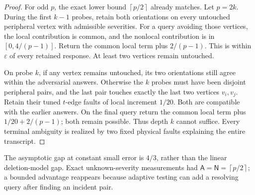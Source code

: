 \documentclass[11pt,letterpaper]{article}
\newcommand{\ceil}[1]{\left\lceil #1\right\rceil}
\newcommand{\A}{\mathsf A}
\newcommand{\N}{\mathsf N}
\begin{document}
\begin{proof}
For odd $p$, the exact lower bound $\ceil{p/2}$ already matches. Let $p=2k$. During the first $k-1$ probes, retain both orientations on every untouched peripheral vertex with admissible severities. For a query avoiding those vertices, the local contribution is common, and the nonlocal contribution is in $[0,4/(p-1)]$. Return the common local term plus $2/(p-1)$. This is within $\varepsilon$ of every retained response. At least two vertices remain untouched.

On probe $k$, if any vertex remains untouched, its two orientations still agree within the adversarial answers. Otherwise the $k$ probes must have been disjoint peripheral pairs, and the last pair touches exactly the last two vertices $v_i,v_j$. Retain their tuned $t$-edge faults of local increment $1/20$. Both are compatible with the earlier answers. On the final query return the common local term plus $1/20+2/(p-1)$; both remain possible. Thus depth $k$ cannot suffice. Every terminal ambiguity is realized by two fixed physical faults explaining the entire transcript.
\end{proof}

The asymptotic gap at constant small error is $4/3$, rather than the linear deletion-model gap. Exact unknown-severity measurements had $\A=\N=\ceil{p/2}$; a bounded advantage reappears because adaptive testing can add a resolving query after finding an incident pair.
\end{document}
